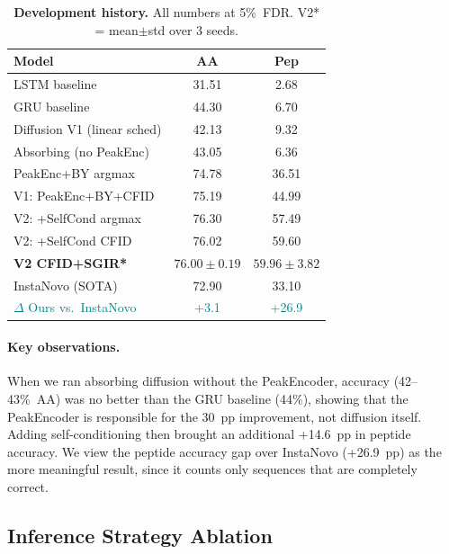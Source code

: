 \documentclass[10pt,twocolumn]{article}
\begin{document}
\begin{table}[t]
  \centering
  \caption{
    \textbf{Development history.}
    All numbers at 5\%~FDR.
    V2* = mean$\pm$std over 3 seeds.
  }
  \label{tab:main}
  \setlength{\tabcolsep}{4pt}
  \small
  \begin{tabular}{lcc}
    \toprule
    Model & AA & Pep \\
    \midrule
    LSTM baseline               & 31.51 & 2.68  \\
    GRU baseline                & 44.30 & 6.70  \\
    Diffusion V1 (linear sched) & 42.13 & 9.32  \\
    Absorbing (no PeakEnc)      & 43.05 & 6.36  \\
    \midrule
    PeakEnc+BY argmax           & 74.78 & 36.51 \\
    V1: PeakEnc+BY+CFID         & 75.19 & 44.99 \\
    \midrule
    V2: +SelfCond argmax        & 76.30 & 57.49 \\
    V2: +SelfCond CFID          & 76.02 & 59.60 \\
    \rowcolor{green!10}
    \textbf{V2 CFID+SGIR*}      & $76.00{\pm}0.19$ & $59.96{\pm}3.82$ \\
    \midrule
    InstaNovo (SOTA)            & 72.90 & 33.10 \\
    \textcolor{teal}{$\Delta$ Ours vs.\ InstaNovo} & \textcolor{teal}{+3.1} & \textcolor{teal}{+26.9} \\
    \bottomrule
  \end{tabular}
\end{table}

\paragraph{Key observations.}
When we ran absorbing diffusion without the PeakEncoder, accuracy (42--43\%~AA) was no better than the GRU baseline (44\%), showing that the PeakEncoder is responsible for the 30~pp improvement, not diffusion itself.
Adding self-conditioning then brought an additional +14.6~pp in peptide accuracy.
We view the peptide accuracy gap over InstaNovo (+26.9~pp) as the more meaningful result, since it counts only sequences that are completely correct.

\subsection{Inference Strategy Ablation}
\end{document}

